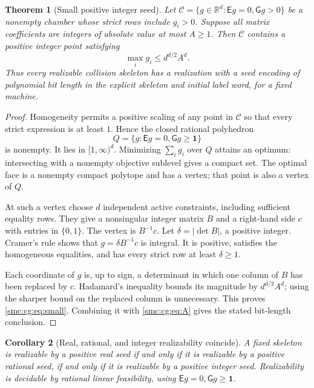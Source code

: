 \documentclass[11pt,letterpaper]{article}
\numberwithin{equation}{section}
\newtheorem{theorem}{Theorem}[section]
\newtheorem{corollary}[theorem]{Corollary}
\theoremstyle{definition}
\theoremstyle{remark}
\newcommand{\R}{\mathbb R}
\newcommand{\Ccal}{\mathcal C}
\begin{document}
\begin{theorem}[Small positive integer seed]
\label{smc:cg:thm:small}
Let $\Ccal=\{g\in\R^d:\mathsf E g=0,\mathsf Gg>0\}$ be a nonempty chamber
whose strict rows include $g_i>0$. Suppose all matrix coefficients are
integers of absolute value at most $A\ge1$. Then $\Ccal$ contains a positive
integer point satisfying
\begin{equation}
 \max_i g_i\le d^{d/2}A^d.
 \label{smc:cg:eq:small}
\end{equation}
Thus every realizable collision skeleton has a realization with a seed
encoding of polynomial bit length in the explicit skeleton and initial
label word, for a fixed machine.
\end{theorem}
\begin{proof}
Homogeneity permits a positive scaling of any point in $\Ccal$ so that every
strict expression is at least $1$. Hence the closed rational polyhedron
\[
 Q=\{g:\mathsf E g=0,\mathsf Gg\ge\mathbf1\}
\]
is nonempty. It lies in $[1,\infty)^d$. Minimizing $\sum_i g_i$ over $Q$
attains an optimum: intersecting with a nonempty objective sublevel gives
a compact set. The optimal face is a nonempty compact polytope and has a
vertex; that point is also a vertex of $Q$.

At such a vertex choose $d$ independent active constraints, including
sufficient equality rows. They give a nonsingular integer matrix $B$ and a
right-hand side $c$ with entries in $\{0,1\}$. The vertex is $B^{-1}c$.
Let $\delta=|\det B|$, a positive integer. Cramer's rule shows that
$g=\delta B^{-1}c$ is integral. It is positive, satisfies the homogeneous
equalities, and has every strict row at least $\delta\ge1$.

Each coordinate of $g$ is, up to sign, a determinant in which one column of
$B$ has been replaced by $c$. Hadamard's inequality bounds its magnitude by
$d^{d/2}A^d$; using the sharper bound on the replaced column is unnecessary.
This proves \eqref{smc:cg:eq:small}. Combining it with \eqref{smc:cg:eq:A} gives the stated
bit-length conclusion.
\end{proof}

\begin{corollary}[Real, rational, and integer realizability coincide]
A fixed skeleton is realizable by a positive real seed if and only if it is
realizable by a positive rational seed, if and only if it is realizable by a
positive integer seed. Realizability is decidable by rational linear
feasibility, using $\mathsf E g=0,\mathsf Gg\ge\mathbf1$.
\end{corollary}
\end{document}
